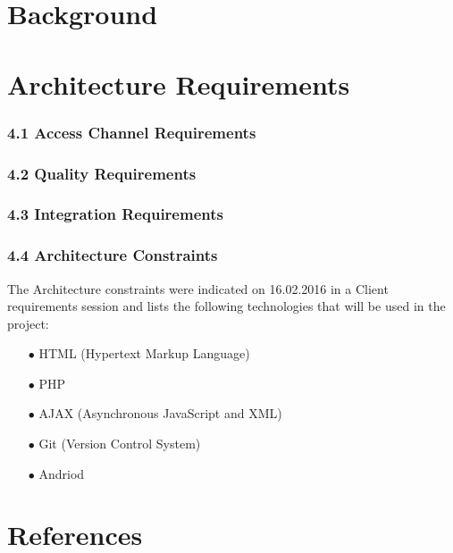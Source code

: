 \documentclass[a4paper,12pt]{report}
\begin{document}
\newpage
\section{Background}

\newpage
\section{Architecture Requirements}
\subsubsection{4.1 Access Channel Requirements}
\subsubsection{4.2 Quality Requirements}
\subsubsection{4.3 Integration Requirements}

\subsubsection{4.4 Architecture Constraints}
The Architecture constraints were indicated on 16.02.2016 in a Client requirements session and lists the following technologies that will be used in the project:
\begin{itemize}
	\item[$\bullet$]HTML (Hypertext Markup Language) 
	\item[$\bullet$]PHP
	\item[$\bullet$]AJAX (Asynchronous JavaScript and XML)
	\item[$\bullet$]Git (Version Control System)
	\item[$\bullet$]Andriod
	\\
\end{itemize}

\newpage
\section{References}
\end{document}
